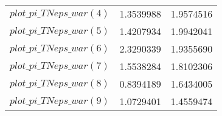 \begin{center}
\begin{longtable}{lcc}
$plot\_pi\_TN eps\_war (4)   $	 & 	      1.3539988	 & 	      1.9574516 \\ 
$plot\_pi\_TN eps\_war (5)   $	 & 	      1.4207934	 & 	      1.9942041 \\ 
$plot\_pi\_TN eps\_war (6)   $	 & 	      2.3290339	 & 	      1.9355690 \\ 
$plot\_pi\_TN eps\_war (7)   $	 & 	      1.5538284	 & 	      1.8102306 \\ 
$plot\_pi\_TN eps\_war (8)   $	 & 	      0.8394189	 & 	      1.6434005 \\ 
$plot\_pi\_TN eps\_war (9)   $	 & 	      1.0729401	 & 	      1.4559474 \\ 
\end{longtable}
 \end{center}
